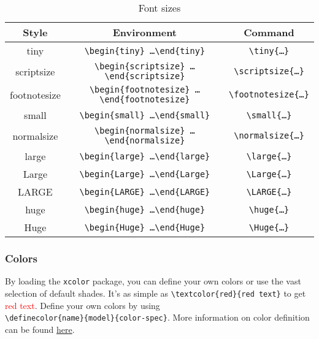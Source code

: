 \begin{table}[h]
	\centering
	\caption{Font sizes}
	\label{tab:fontsizes}
\begin{small}
    \begin{tabular}{c c c}
      \hline
      Style               & Environment                                                                 & Command \\
      \hline
      \tiny{tiny}         & \texttt{\textbackslash begin\{tiny\} \ldots \textbackslash end\{tiny\}}      & \texttt{\textbackslash tiny\{\ldots\}}\\
      \scriptsize{scriptsize} & \texttt{\textbackslash begin\{scriptsize\} \ldots \textbackslash end\{scriptsize\}}      & \texttt{\textbackslash scriptsize\{\ldots\}}\\
      \footnotesize{footnotesize} & \texttt{\textbackslash begin\{footnotesize\} \ldots \textbackslash end\{footnotesize\}}      & \texttt{\textbackslash footnotesize\{\ldots\}}\\
      \small{small} & \texttt{\textbackslash begin\{small\} \ldots \textbackslash end\{small\}}      & \texttt{\textbackslash small\{\ldots\}}\\
      \normalsize{normalsize} & \texttt{\textbackslash begin\{normalsize\} \ldots \textbackslash end\{normalsize\}}      & \texttt{\textbackslash normalsize\{\ldots\}}\\
      \large{large} & \texttt{\textbackslash begin\{large\} \ldots \textbackslash end\{large\}}      & \texttt{\textbackslash large\{\ldots\}}\\
      \Large{Large} & \texttt{\textbackslash begin\{Large\} \ldots \textbackslash end\{Large\}}      & \texttt{\textbackslash Large\{\ldots\}}\\
      \LARGE{LARGE} & \texttt{\textbackslash begin\{LARGE\} \ldots \textbackslash end\{LARGE\}}      & \texttt{\textbackslash LARGE\{\ldots\}}\\
      \huge{huge} & \texttt{\textbackslash begin\{huge\} \ldots \textbackslash end\{huge\}}      & \texttt{\textbackslash huge\{\ldots\}}\\
      \Huge{Huge} & \texttt{\textbackslash begin\{Huge\} \ldots \textbackslash end\{Huge\}}      & \texttt{\textbackslash Huge\{\ldots\}}\\
      \hline
    \end{tabular}
\end{small}
\end{table}


\subsubsection*{Colors}

By loading the \texttt{xcolor} package, you can define your own colors or use the vast selection of default shades. It's as simple as \verb|\textcolor{red}{red text}| to get \textcolor{red}{red text}. Define your own colors by using \\ \verb|\definecolor{name}{model}{color-spec}|. More information on color definition can be found \href{https://www.sharelatex.com/learn/Using_colours_in_LaTeX}{here}.
